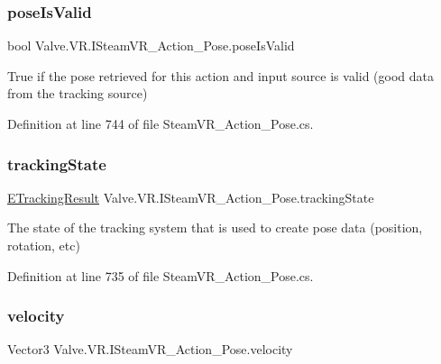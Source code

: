 \subsubsection{\texorpdfstring{poseIsValid}{poseIsValid}}
{\footnotesize\ttfamily bool Valve.\+V\+R.\+I\+Steam\+V\+R\+\_\+\+Action\+\_\+\+Pose.\+pose\+Is\+Valid\hspace{0.3cm}{\ttfamily [get]}}



True if the pose retrieved for this action and input source is valid (good data from the tracking source) 



Definition at line 744 of file Steam\+V\+R\+\_\+\+Action\+\_\+\+Pose.\+cs.

\mbox{\label{interface_valve_1_1_v_r_1_1_i_steam_v_r___action___pose_a9e1c745cb4003d1cad5ea7df89971e5e}} 
\subsubsection{\texorpdfstring{trackingState}{trackingState}}
{\footnotesize\ttfamily \mbox{\hyperlink{namespace_valve_1_1_v_r_abe6feab98f33191b7c27b4292012e90a}{E\+Tracking\+Result}} Valve.\+V\+R.\+I\+Steam\+V\+R\+\_\+\+Action\+\_\+\+Pose.\+tracking\+State\hspace{0.3cm}{\ttfamily [get]}}



The state of the tracking system that is used to create pose data (position, rotation, etc) 



Definition at line 735 of file Steam\+V\+R\+\_\+\+Action\+\_\+\+Pose.\+cs.

\mbox{\label{interface_valve_1_1_v_r_1_1_i_steam_v_r___action___pose_a3e9fbbea68d0351c964de8ad71701c0f}} 
\subsubsection{\texorpdfstring{velocity}{velocity}}
{\footnotesize\ttfamily Vector3 Valve.\+V\+R.\+I\+Steam\+V\+R\+\_\+\+Action\+\_\+\+Pose.\+velocity\hspace{0.3cm}{\ttfamily [get]}}



